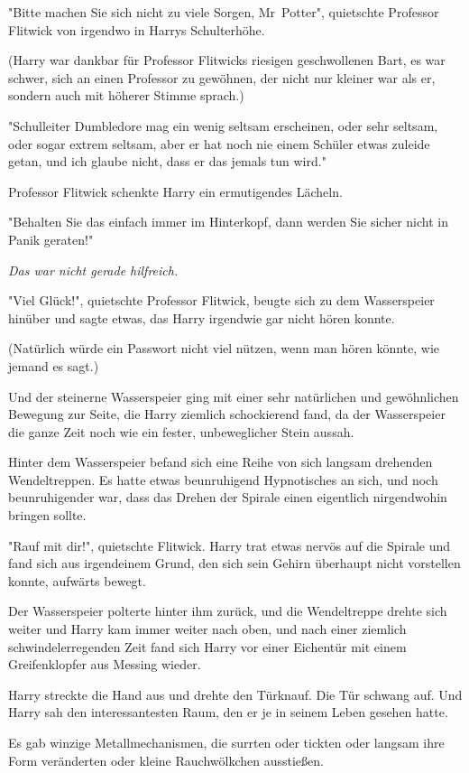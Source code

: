 {"Bitte machen Sie sich nicht zu viele Sorgen, Mr~Potter", quietschte Professor Flitwick von irgendwo in Harrys Schulterhöhe.

(Harry war dankbar für Professor Flitwicks riesigen geschwollenen Bart, es war schwer, sich an einen Professor zu gewöhnen, der nicht nur kleiner war als er, sondern auch mit höherer Stimme sprach.)

"Schulleiter Dumbledore mag ein wenig seltsam erscheinen, oder sehr seltsam, oder sogar extrem seltsam, aber er hat noch nie einem Schüler etwas zuleide getan, und ich glaube nicht, dass er das jemals tun wird."

Professor Flitwick schenkte Harry ein ermutigendes Lächeln.

"Behalten Sie das einfach immer im Hinterkopf, dann werden Sie sicher nicht in Panik geraten!"

\emph{Das war nicht gerade hilfreich.}

"Viel Glück!", quietschte Professor Flitwick, beugte sich zu dem Wasserspeier hinüber und sagte etwas, das Harry irgendwie gar nicht hören konnte.

(Natürlich würde ein Passwort nicht viel nützen, wenn man hören könnte, wie jemand es sagt.)

Und der steinerne Wasserspeier ging mit einer sehr natürlichen und gewöhnlichen Bewegung zur Seite, die Harry ziemlich schockierend fand, da der Wasserspeier die ganze Zeit noch wie ein fester, unbeweglicher Stein aussah.

Hinter dem Wasserspeier befand sich eine Reihe von sich langsam drehenden Wendeltreppen. Es hatte etwas beunruhigend Hypnotisches an sich, und noch beunruhigender war, dass das Drehen der Spirale einen eigentlich nirgendwohin bringen sollte.

"Rauf mit dir!", quietschte Flitwick. Harry trat etwas nervös auf die Spirale und fand sich aus irgendeinem Grund, den sich sein Gehirn überhaupt nicht vorstellen konnte, aufwärts bewegt.

Der Wasserspeier polterte hinter ihm zurück, und die Wendeltreppe drehte sich weiter und Harry kam immer weiter nach oben, und nach einer ziemlich schwindelerregenden Zeit fand sich Harry vor einer Eichentür mit einem Greifenklopfer aus Messing wieder.

Harry streckte die Hand aus und drehte den Türknauf. Die Tür schwang auf. Und Harry sah den interessantesten Raum, den er je in seinem Leben gesehen hatte.

Es gab winzige Metallmechanismen, die surrten oder tickten oder langsam ihre Form veränderten oder kleine Rauchwölkchen ausstießen.

}
